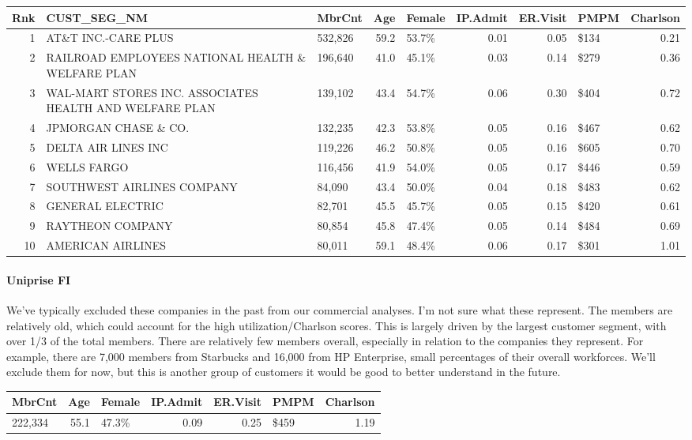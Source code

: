 \documentclass[]{article}
\let\oldparagraph\paragraph
\renewcommand{\paragraph}[1]{\oldparagraph{#1}\mbox{}}
\begin{document}
\begin{longtable}[]{@{}rllrlrrlr@{}}
\toprule
Rnk & CUST\_SEG\_NM & MbrCnt & Age & Female & IP.Admit & ER.Visit & PMPM
& Charlson\tabularnewline
\midrule
\endhead
1 & AT\&T INC.-CARE PLUS & 532,826 & 59.2 & 53.7\% & 0.01 & 0.05 & \$134
& 0.21\tabularnewline
2 & RAILROAD EMPLOYEES NATIONAL HEALTH \& WELFARE PLAN & 196,640 & 41.0
& 45.1\% & 0.03 & 0.14 & \$279 & 0.36\tabularnewline
3 & WAL-MART STORES INC. ASSOCIATES HEALTH AND WELFARE PLAN & 139,102 &
43.4 & 54.7\% & 0.06 & 0.30 & \$404 & 0.72\tabularnewline
4 & JPMORGAN CHASE \& CO. & 132,235 & 42.3 & 53.8\% & 0.05 & 0.16 &
\$467 & 0.62\tabularnewline
5 & DELTA AIR LINES INC & 119,226 & 46.2 & 50.8\% & 0.05 & 0.16 & \$605
& 0.70\tabularnewline
6 & WELLS FARGO & 116,456 & 41.9 & 54.0\% & 0.05 & 0.17 & \$446 &
0.59\tabularnewline
7 & SOUTHWEST AIRLINES COMPANY & 84,090 & 43.4 & 50.0\% & 0.04 & 0.18 &
\$483 & 0.62\tabularnewline
8 & GENERAL ELECTRIC & 82,701 & 45.5 & 45.7\% & 0.05 & 0.15 & \$420 &
0.61\tabularnewline
9 & RAYTHEON COMPANY & 80,854 & 45.8 & 47.4\% & 0.05 & 0.14 & \$484 &
0.69\tabularnewline
10 & AMERICAN AIRLINES & 80,011 & 59.1 & 48.4\% & 0.06 & 0.17 & \$301 &
1.01\tabularnewline
\bottomrule
\end{longtable}

\paragraph{Uniprise FI}\label{uniprise-fi}

We've typically excluded these companies in the past from our commercial
analyses. I'm not sure what these represent. The members are relatively
old, which could account for the high utilization/Charlson scores. This
is largely driven by the largest customer segment, with over 1/3 of the
total members. There are relatively few members overall, especially in
relation to the companies they represent. For example, there are 7,000
members from Starbucks and 16,000 from HP Enterprise, small percentages
of their overall workforces. We'll exclude them for now, but this is
another group of customers it would be good to better understand in the
future.

\begin{longtable}[]{@{}lrlrrlr@{}}
\toprule
MbrCnt & Age & Female & IP.Admit & ER.Visit & PMPM &
Charlson\tabularnewline
\midrule
\endhead
222,334 & 55.1 & 47.3\% & 0.09 & 0.25 & \$459 & 1.19\tabularnewline
\bottomrule
\end{longtable}
\end{document}
